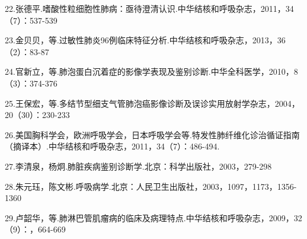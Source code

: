22.张德平.嗜酸性粒细胞性肺病：亟待澄清认识.中华结核和呼吸杂志，2011，34（7）：537-539

23.金贝贝，等.过敏性肺炎96例临床特征分析.中华结核和呼吸杂志，2013，36（2）：83-87

24.官新立，等.肺泡蛋白沉着症的影像学表现及鉴别诊断.中华全科医学，2010，8（3）：374-376

25.王保宏，等.多结节型细支气管肺泡癌影像诊断及误诊实用放射学杂志，2004，20（30）：230-233

26.美国胸科学会，欧洲呼吸学会，日本呼吸学会等.特发性肺纤维化诊治循证指南（摘译本）.中华结核和呼吸杂志，2011，34（7）：486-494.

27.李清泉，杨炯.肺脏疾病鉴别诊断学.北京：科学出版社，2003，279-298

28.朱元珏，陈文彬.呼吸病学.北京：人民卫生出版社，2003，1097，1173，1356-1360

29.卢韶华，等.肺淋巴管肌瘤病的临床及病理特点.中华结核和呼吸杂志，2009，32（9）：，664-669

\protect\hypertarget{text00088.html}{}{}

